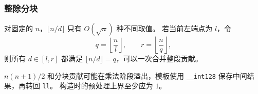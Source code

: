 \subsubsection{整除分块}

对固定的 $n$，$\lfloor n/d\rfloor$ 只有 $O(\sqrt n)$ 种不同取值。
若当前左端点为 $l$，令
\[
  q=\left\lfloor\frac nl\right\rfloor,
  \qquad
  r=\left\lfloor\frac nq\right\rfloor,
\]
则所有 $d\in[l,r]$ 都满足 $\lfloor n/d\rfloor=q$，可以一次合并整段贡献。

\begin{icpcwarning}[实现细节]
  $n(n+1)/2$ 和分块贡献可能在乘法阶段溢出，模板使用
  \texttt{\_\_int128} 保存中间结果，再转回 \texttt{ll}。
  构造时的预处理上界至少应为 $1$。
\end{icpcwarning}
